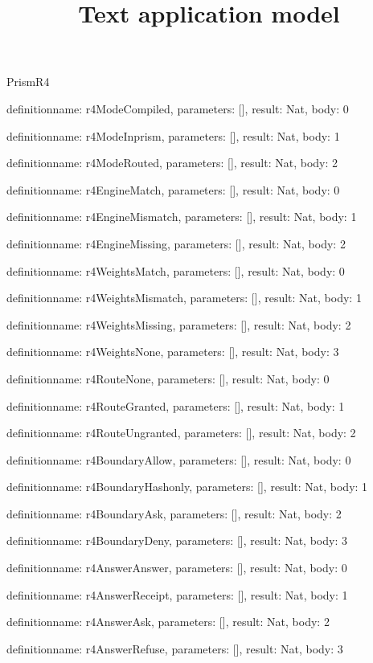 \begin{lexlean}{PrismR4}
\title{Text application model}
\begin{semanticmodule}
definition{name: r4ModeCompiled, parameters: [], result: Nat, body: 0}

definition{name: r4ModeInprism, parameters: [], result: Nat, body: 1}

definition{name: r4ModeRouted, parameters: [], result: Nat, body: 2}

definition{name: r4EngineMatch, parameters: [], result: Nat, body: 0}

definition{name: r4EngineMismatch, parameters: [], result: Nat, body: 1}

definition{name: r4EngineMissing, parameters: [], result: Nat, body: 2}

definition{name: r4WeightsMatch, parameters: [], result: Nat, body: 0}

definition{name: r4WeightsMismatch, parameters: [], result: Nat, body: 1}

definition{name: r4WeightsMissing, parameters: [], result: Nat, body: 2}

definition{name: r4WeightsNone, parameters: [], result: Nat, body: 3}

definition{name: r4RouteNone, parameters: [], result: Nat, body: 0}

definition{name: r4RouteGranted, parameters: [], result: Nat, body: 1}

definition{name: r4RouteUngranted, parameters: [], result: Nat, body: 2}

definition{name: r4BoundaryAllow, parameters: [], result: Nat, body: 0}

definition{name: r4BoundaryHashonly, parameters: [], result: Nat, body: 1}

definition{name: r4BoundaryAsk, parameters: [], result: Nat, body: 2}

definition{name: r4BoundaryDeny, parameters: [], result: Nat, body: 3}

definition{name: r4AnswerAnswer, parameters: [], result: Nat, body: 0}

definition{name: r4AnswerReceipt, parameters: [], result: Nat, body: 1}

definition{name: r4AnswerAsk, parameters: [], result: Nat, body: 2}

definition{name: r4AnswerRefuse, parameters: [], result: Nat, body: 3}


\end{semanticmodule}
\end{lexlean}
